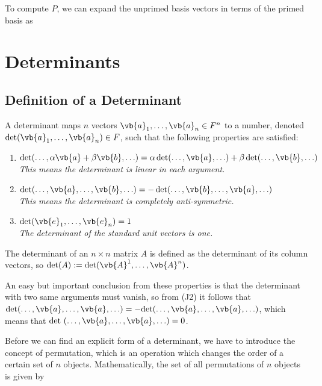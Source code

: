 \documentclass[a4paper,12pt]{report}
\begin{document}
To compute \(P\), we can expand the unprimed basis vectors in terms of the primed basis as 

\chapter{Determinants}

\section{Definition of a Determinant}

\begin{definition}
    A determinant maps \( n \) vectors \(\vb{a}_1, \ldots, \vb{a}_n \in F^n\) to a number, denoted \(\det(\vb{a}_1, \ldots, \vb{a}_n) \in F\), such that the following properties are satisfied:
    \begin{enumerate}[label=(J\arabic*)]
        \item \(\det(\ldots, \alpha \vb{a} + \beta \vb{b}, \ldots) = \alpha \det(\ldots, \vb{a}, \ldots) + \beta \det(\ldots, \vb{b}, \ldots)\)\\
        \textit{This means the determinant is linear in each argument.}
        
        \item \(\det(\ldots, \vb{a}, \ldots, \vb{b}, \ldots) = -\det(\ldots, \vb{b}, \ldots, \vb{a}, \ldots)\)\\
        \textit{This means the determinant is completely anti-symmetric.}
        
        \item \(\det(\vb{e}_1, \ldots, \vb{e}_n) = 1\)\\
        \textit{The determinant of the standard unit vectors is one.}
    \end{enumerate}
    The determinant of an \( n \times n \) matrix \( A \) is defined as the determinant of its column vectors, so \(\det(A) := \det(\vb{A}^1, \ldots, \vb{A}^n)\).
\end{definition}

An easy but important conclusion from these properties is that the determinant with two same arguments must vanish, so from (J2) it follows that \(\text{det}(\ldots , \vb{a} , \ldots , \vb{a} , \ldots ) = - \text{det}(\ldots ,\vb{a} ,\ldots ,\vb{a} ,\ldots )  \), which means that \(\text{det }(\ldots , \vb{a} ,\ldots ,\vb{a} ,\ldots ) = 0  \). 

Before we can find an explicit form of a determinant, we have to introduce the concept of permutation, which is an operation which changes the order of a certain set of \(n\) objects. Mathematically, the set of all permutations of \(n\) objects is given by 
\end{document}
